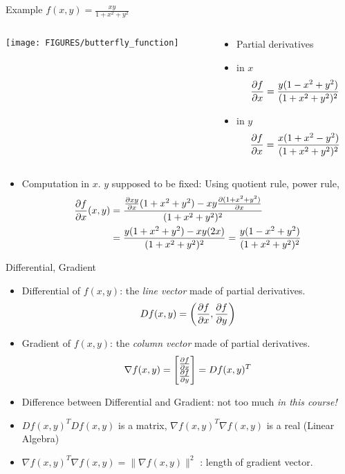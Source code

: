\documentclass[8pt,dvipsnames]{beamer}
\begin{document}
\begin{frame}{Example $f(x,y) = \frac{xy}{1 + x^2 + y^2}$ }
  \begin{columns}
    \begin{column}{0.6\textwidth}
      \begin{center}
        \texttt{[image: FIGURES/butterfly\_function]}
      \end{center}
    \end{column}
    \begin{column}{0.4\textwidth}
      \begin{itemize}
        \item Partial derivatives
        \item in $x$
        $$
        \frac{\partial{f}}{\partial{x}} = \frac{y(1-x^2 + y^2)}{(1 + x^2+y^2)^2}
        $$
        \item in $y$
        $$ 
        \frac{\partial{f}}{\partial{x}} = \frac{x(1+x^2 - y^2)}{(1 + x^2+y^2)^2}
        $$
      \end{itemize}
    \end{column}
  \end{columns}
  \medskip
  \begin{itemize}
    \item Computation in $x$. $y$ supposed to be fixed: Using quotient rule, power rule, 
    \begin{align*}
      \frac{\partial{f}}{\partial{x}}(x,y) & = \frac{
      \frac{\partial{xy}}{\partial{x}}(1+x^2+y^2) - xy\frac{\partial{(1+x^2+y^2)}}{\partial{x}}}{(1+x^2+y^2)^2}\\
      &= \frac{y(1+x^2+y^2) -xy(2x)}{(1+x^2+y^2)^2}= \frac{y(1-x^2+y^2)}{(1+x^2+y^2)^2}
    \end{align*}
  \end{itemize}
\end{frame}


\begin{frame}{Differential, Gradient}
  \begin{itemize}[<+->]
    \item Differential of $f(x,y)$: the \emph{line vector} made of partial derivatives.
    $$
    Df(x,y) = \left(\frac{\partial{f}}{\partial{x}},\frac{\partial{f}}{\partial{y}}\right)
    $$\vfill
    \item Gradient of $f(x,y)$: the \emph{column vector} made of partial derivatives.
    $$
    \nabla f(x,y) = \begin{bmatrix}\frac{\partial{f}}{\partial{x}}\\\frac{\partial{f}}{\partial{y}}\end{bmatrix} = Df(x,y)^T
    $$\vfill
    \item Difference between Differential and Gradient:  not too much \emph{in this course!}
    \vfill
    \item[\raisebox{1mm}{\dbend}] $Df(x,y)^TDf(x,y)$ is a matrix, $\nabla f(x,y)^T \nabla f(x,y)$ is a real (Linear Algebra) 
    \vfill
    \item $\nabla f(x,y)^T \nabla f(x,y) = \|\nabla f(x,y)\|^2$ : length of gradient vector.
  \end{itemize}
\end{frame}
\end{document}
